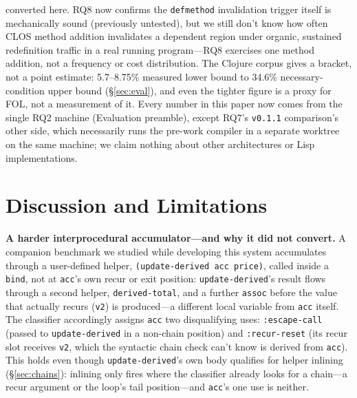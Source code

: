 \documentclass[sigplan,review,anonymous]{acmart}
\begin{document}
converted here. RQ8 now confirms the \texttt{defmethod} invalidation trigger itself is mechanically sound (previously untested), but we still don't know how often CLOS method addition invalidates a dependent region under organic, sustained redefinition traffic in a real running program---RQ8 exercises one method addition, not a frequency or cost distribution. The Clojure corpus gives a bracket, not a point estimate: 5.7--8.75\% measured lower bound to 34.6\% necessary-condition upper bound (§\ref{sec:eval}), and even the tighter figure is a proxy for FOL, not a measurement of it. Every number in this paper now comes from the single RQ2 machine (Evaluation preamble), except RQ7's \texttt{v0.1.1} comparison's other side, which necessarily runs the pre-work compiler in a separate worktree on the same machine; we claim nothing about other architectures or Lisp implementations.

\section{Discussion and Limitations}
\label{sec:discussion}
\textbf{A harder interprocedural accumulator---and why it did not convert.} A companion benchmark we studied while developing this system accumulates through a user-defined helper, \texttt{(update-derived acc price)}, called inside a \texttt{bind}, not at \texttt{acc}'s own recur or exit position: \texttt{update-derived}'s result flows through a second helper, \texttt{derived-total}, and a further \texttt{assoc} before the value that actually recurs (\texttt{v2}) is produced---a different local variable from \texttt{acc} itself. The classifier accordingly assigns \texttt{acc} two disqualifying uses: \texttt{:escape-call} (passed to \texttt{update-derived} in a non-chain position) and \texttt{:recur-reset} (its recur slot receives \texttt{v2}, which the syntactic chain check can't know is derived from \texttt{acc}). This holds even though \texttt{update-derived}'s own body qualifies for helper inlining (§\ref{sec:chains}): inlining only fires where the classifier already looks for a chain---a recur argument or the loop's tail position---and \texttt{acc}'s one use is neither.
\end{document}
